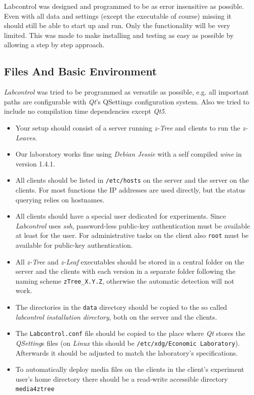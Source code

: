 \documentclass[a4paper,10pt]{article}
\begin{document}
Labcontrol was designed and programmed to be as error insensitive as possible. Even with all data and settings (except the executable of course) missing it should still be able to start up and run. Only the functionality will be very limited. This was made to make installing and testing as easy as possible by allowing a step by step approach.

\subsection{Files And Basic Environment}

\emph{Labcontrol} was tried to be programmed as versatile as possible, e.g. all important paths are configurable with \emph{Qt}'s QSettings configuration system. Also we tried to include no compilation time dependencies except \emph{Qt5}.
\begin{itemize}
  \item Your setup should consist of a server running \emph{z-Tree} and clients to run the \emph{z-Leaves}.
  \item Our laboratory works fine using \emph{Debian Jessie} with a self compiled \emph{wine} in version 1.4.1.
  \item All clients should be listed in \texttt{/etc/hosts} on the server and the server on the clients. For most functions the IP addresses are used directly, but the status querying relies on hostnames.
  \item All clients should have a special user dedicated for experiments. Since \emph{Labcontrol} uses \emph{ssh}, password-less public-key authentication must be available at least for the user. For administrative tasks on the client also \texttt{root} must be available for public-key authentication.
  \item All \emph{z-Tree} and \emph{z-Leaf} executables should be stored in a central folder on the server and the clients with each version in a separate folder following the naming scheme \texttt{zTree\_X.Y.Z}, otherwise the automatic detection will not work.
  \item The directories in the \texttt{data} directory should be copied to the so called \emph{labcontrol installation directory}, both on the server and the clients.
  \item The \texttt{Labcontrol.conf} file should be copied to the place where \emph{Qt} stores the \emph{QSetting}s files (on \emph{Linux} this should be \texttt{/etc/xdg/Economic\ Laboratory}). Afterwards it should be adjusted to match the laboratory's specifications.
  \item To automatically deploy media files on the clients in the client's experiment user's home directory there should be a read-write accessible directory \texttt{media4ztree}
\end{itemize}
\end{document}
